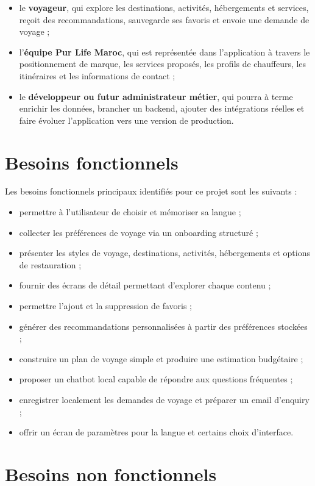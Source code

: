\documentclass[12pt,a4paper]{report}
\begin{document}
\begin{itemize}
\item le \textbf{voyageur}, qui explore les destinations, activités, hébergements et services, reçoit des recommandations, sauvegarde ses favoris et envoie une demande de voyage ;
\item l'\textbf{équipe Pur Life Maroc}, qui est représentée dans l'application à travers le positionnement de marque, les services proposés, les profils de chauffeurs, les itinéraires et les informations de contact ;
\item le \textbf{développeur ou futur administrateur métier}, qui pourra à terme enrichir les données, brancher un backend, ajouter des intégrations réelles et faire évoluer l'application vers une version de production.
\end{itemize}

\section{Besoins fonctionnels}

Les besoins fonctionnels principaux identifiés pour ce projet sont les suivants :

\begin{itemize}
\item permettre à l'utilisateur de choisir et mémoriser sa langue ;
\item collecter les préférences de voyage via un onboarding structuré ;
\item présenter les styles de voyage, destinations, activités, hébergements et options de restauration ;
\item fournir des écrans de détail permettant d'explorer chaque contenu ;
\item permettre l'ajout et la suppression de favoris ;
\item générer des recommandations personnalisées à partir des préférences stockées ;
\item construire un plan de voyage simple et produire une estimation budgétaire ;
\item proposer un chatbot local capable de répondre aux questions fréquentes ;
\item enregistrer localement les demandes de voyage et préparer un email d'enquiry ;
\item offrir un écran de paramètres pour la langue et certains choix d'interface.
\end{itemize}

\section{Besoins non fonctionnels}
\end{document}
